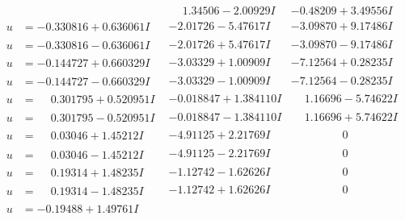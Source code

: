 \documentclass[1p]{elsarticle_modified}
\theoremstyle{definition}
\begin{document}
$$\begin{array}{c|c|c}
 & \phantom{-}1.34506 - 2.00929 I & -0.48209 + 3.49556 I \\ \hline\begin{aligned}
u &= -0.330816 + 0.636061 I\end{aligned}
 & -2.01726 - 5.47617 I & -3.09870 + 9.17486 I \\ \hline\begin{aligned}
u &= -0.330816 - 0.636061 I\end{aligned}
 & -2.01726 + 5.47617 I & -3.09870 - 9.17486 I \\ \hline\begin{aligned}
u &= -0.144727 + 0.660329 I\end{aligned}
 & -3.03329 + 1.00909 I & -7.12564 + 0.28235 I \\ \hline\begin{aligned}
u &= -0.144727 - 0.660329 I\end{aligned}
 & -3.03329 - 1.00909 I & -7.12564 - 0.28235 I \\ \hline\begin{aligned}
u &= \phantom{-}0.301795 + 0.520951 I\end{aligned}
 & -0.018847 + 1.384110 I & \phantom{-}1.16696 - 5.74622 I \\ \hline\begin{aligned}
u &= \phantom{-}0.301795 - 0.520951 I\end{aligned}
 & -0.018847 - 1.384110 I & \phantom{-}1.16696 + 5.74622 I \\ \hline\begin{aligned}
u &= \phantom{-}0.03046 + 1.45212 I\end{aligned}
 & -4.91125 + 2.21769 I & \phantom{-0.000000 } 0 \\ \hline\begin{aligned}
u &= \phantom{-}0.03046 - 1.45212 I\end{aligned}
 & -4.91125 - 2.21769 I & \phantom{-0.000000 } 0 \\ \hline\begin{aligned}
u &= \phantom{-}0.19314 + 1.48235 I\end{aligned}
 & -1.12742 - 1.62626 I & \phantom{-0.000000 } 0 \\ \hline\begin{aligned}
u &= \phantom{-}0.19314 - 1.48235 I\end{aligned}
 & -1.12742 + 1.62626 I & \phantom{-0.000000 } 0 \\ \hline\begin{aligned}
u &= -0.19488 + 1.49761 I\end{aligned}

\end{array}$$
\end{document}
